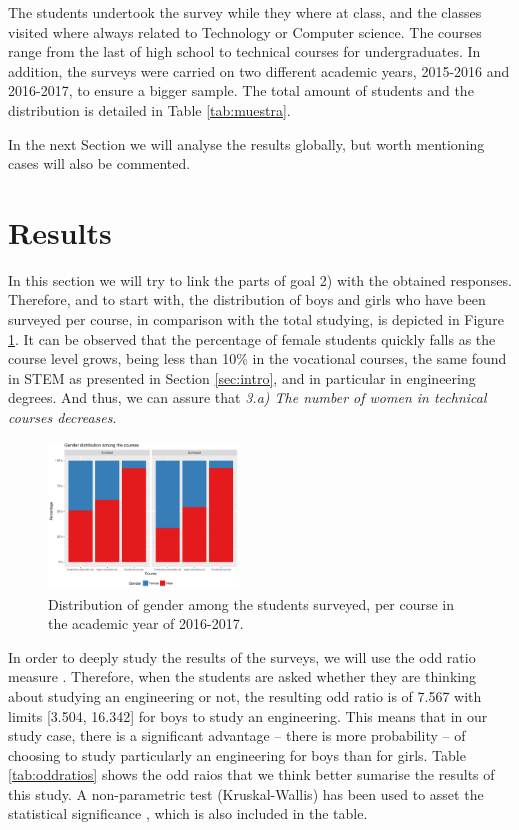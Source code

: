 \documentclass[journal,transmag]{IEEEtran}
\begin{document}
The students undertook the survey while they where at class, and the classes visited where always related to Technology or Computer science. The courses range from the last of high school to technical courses for undergraduates. In addition, the surveys were carried on two different academic years, 2015-2016 and 2016-2017, to ensure a bigger sample. The total amount of students and the distribution is detailed in Table \ref{tab:muestra}.

In the next Section we will analyse the results globally, but worth mentioning cases will also be commented.

\section{Results}
\label{sec:results}

In this section we will try to link the parts of goal 2) with the obtained responses. Therefore, and to start with, the distribution of boys and girls who have been surveyed per course, in comparison with the total studying, is depicted in Figure \ref{fig:alumni}. It can be observed that the percentage of female students quickly falls as the course level grows, being less than 10\% in the vocational courses, the same found in STEM as presented in Section \ref{sec:intro}, and in particular in engineering degrees. And thus, we can assure that \textit{3.a) The number of women in technical courses decreases}.

\begin{figure}
  \centering
  \includegraphics[width=0.45\textwidth]{img/gender_distribution.pdf}
  \caption{Distribution of gender among the students surveyed, per course in the academic year of 2016-2017.}
  \label{fig:alumni}
\end{figure}

In order to deeply study the results of the surveys, we will use the odd ratio measure \cite{bibid}. Therefore, when the students are asked whether they are thinking about studying an engineering or not, the resulting odd ratio is of 7.567 with limits [3.504, 16.342] for boys to study an engineering. This means that in our study case, there is a significant advantage -- there is more probability -- of choosing to study particularly an engineering for boys than for girls. Table \ref{tab:oddratios} shows the odd raios that we think better sumarise the results of this study. A non-parametric test (Kruskal-Wallis) has been used to asset the statistical significance \cite{DerracTests11}, which is also included in the table.
\end{document}
